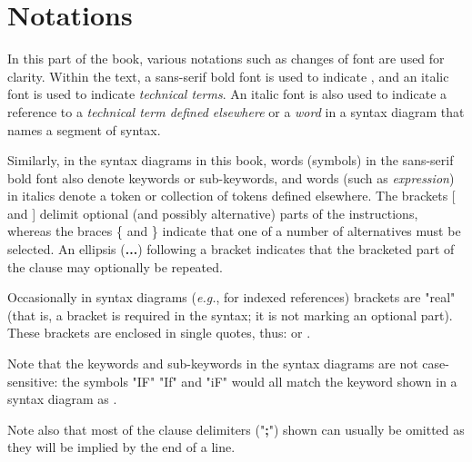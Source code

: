 \section{Notations}\label{refnotat}
 
In this part of the
book,
various notations such as changes of font are used for clarity.
Within the text, a
sans-serif bold font is used to indicate , and an italic
font is used to indicate \emph{technical terms}.
An italic font is also used to indicate a reference to a
\emph{technical term defined elsewhere} or a \emph{word} in a
syntax diagram that names a segment of syntax.
 
Similarly, in the syntax diagrams in this
book,
words (symbols) in the
sans-serif
bold font also denote keywords or
sub-keywords, and words (such as \emph{expression}) in italics
denote a token or collection of tokens defined elsewhere.
The brackets [ and ] delimit optional (and possibly
alternative) parts of the instructions, whereas the braces \{
and \} indicate that one of a number of alternatives must be
selected.
An ellipsis (\textbf{...}) following a bracket indicates that
the bracketed part of the clause may optionally be repeated.
 
Occasionally in syntax diagrams (\emph{e.g.}, for indexed references)
brackets are "real" (that is, a bracket is required in the
syntax; it is not marking an optional part).
These brackets are enclosed in single quotes, thus:
\keyword{'['} or \keyword{']'}.
 
Note that the keywords and sub-keywords in the syntax diagrams are not
case-sensitive: the symbols "IF" "If" and "iF" would
all match the keyword shown in a syntax diagram as .
 
Note also that most of the clause delimiters ("\textbf{;}") shown
can usually be omitted as they will be implied by the end of a line.
